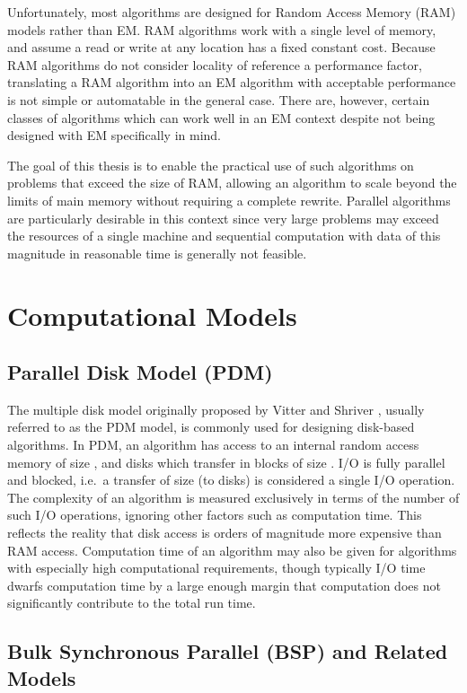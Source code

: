 \documentclass[12pt]{carletoncsthesis}
\begin{document}
Unfortunately, most algorithms are designed for Random Access Memory (RAM)
models rather than EM.  RAM algorithms work with a single level of memory,
and assume a read or write at any location has a fixed constant cost.
Because RAM algorithms do not consider locality of reference a performance
factor, translating a RAM algorithm into an EM algorithm with acceptable
performance is not simple or automatable in the general case.  There are,
however, certain classes of algorithms which can work well in an EM context
despite not being designed with EM specifically in mind.

The goal of this thesis is to enable the practical use of such algorithms
on problems that exceed the size of RAM, allowing an algorithm to scale
beyond the limits of main memory without requiring a complete rewrite.
Parallel algorithms are particularly desirable in this context since very
large problems may exceed the resources of a single machine and sequential
computation with data of this magnitude in reasonable time is generally
not feasible.

\section{Computational Models}


\subsection{Parallel Disk Model (PDM)}


The multiple disk model originally proposed by Vitter and Shriver
\cite{pdm1}\cite{pdm2}, usually referred to as the PDM model, is commonly
used for designing disk-based algorithms.  In PDM, an algorithm has access
to an internal random access memory of size , and  disks which transfer
in blocks of size .  I/O is fully parallel and blocked, i.e.\ a transfer of
size  (to  disks) is considered a single I/O operation.  The complexity
of an algorithm is measured exclusively in terms of the number of such I/O
operations, ignoring other factors such as computation time.  This reflects
the reality that disk access is orders of magnitude more expensive than RAM
access.  Computation time of an algorithm may also be given for algorithms
with especially high computational requirements, though typically I/O time
dwarfs computation time by a large enough margin that computation does not
significantly contribute to the total run time.

\subsection{Bulk Synchronous Parallel (BSP) and Related Models}
\end{document}
